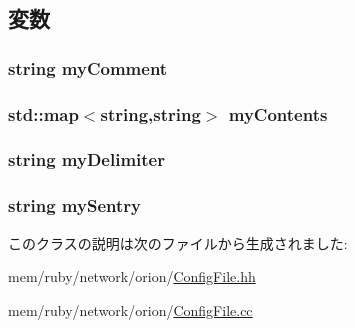 \subsection{変数}
\hypertarget{classConfigFile_a1112d00b3f3aa676ca93e148a6f3792f}{
\subsubsection[{myComment}]{\setlength{\rightskip}{0pt plus 5cm}string {\bf myComment}}}
\label{classConfigFile_a1112d00b3f3aa676ca93e148a6f3792f}
\hypertarget{classConfigFile_a3ab1162ad6495f6102af2082df0bfa3b}{
\subsubsection[{myContents}]{\setlength{\rightskip}{0pt plus 5cm}std::map$<$string,string$>$ {\bf myContents}}}
\label{classConfigFile_a3ab1162ad6495f6102af2082df0bfa3b}
\hypertarget{classConfigFile_acfa392eb20e5a977f077a3e96bad6bf7}{
\subsubsection[{myDelimiter}]{\setlength{\rightskip}{0pt plus 5cm}string {\bf myDelimiter}}}
\label{classConfigFile_acfa392eb20e5a977f077a3e96bad6bf7}
\hypertarget{classConfigFile_a1f5ee3be5d9f07feb3d1dc9a2f22ccfa}{
\subsubsection[{mySentry}]{\setlength{\rightskip}{0pt plus 5cm}string {\bf mySentry}}}
\label{classConfigFile_a1f5ee3be5d9f07feb3d1dc9a2f22ccfa}


このクラスの説明は次のファイルから生成されました:\begin{DoxyCompactItemize}
\item 
mem/ruby/network/orion/\hyperlink{ConfigFile_8hh}{ConfigFile.hh}\item 
mem/ruby/network/orion/\hyperlink{ConfigFile_8cc}{ConfigFile.cc}\end{DoxyCompactItemize}
